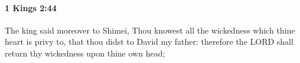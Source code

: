 
		\paragraph{1 Kings 2:44} %
			\label{1KINGS-2-44}

			The king said moreover to Shimei, Thou knowest all the wickedness which thine heart is privy to, that thou didst to David my father: therefore the LORD shall return thy wickedness upon thine own head;


